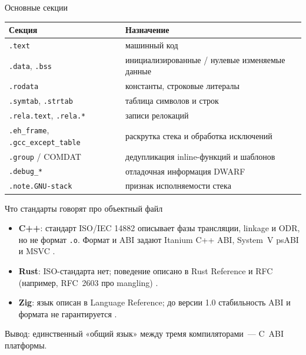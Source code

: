 \documentclass[aspectratio=169,11pt]{beamer}
\begin{document}
\begin{frame}{Основные секции}
  \small
  \begin{center}
    \begin{tabularx}{0.90\textwidth}{lY}
      \toprule
      Секция \cite{tis}                                   & Назначение                                                  \\
      \midrule
      \texttt{.text}                                      & машинный код                                                \\
      \texttt{.data}, \texttt{.bss}                       & инициализированные / нулевые изменяемые данные              \\
      \texttt{.rodata}                                    & константы, строковые литералы                               \\
      \texttt{.symtab}, \texttt{.strtab}                  & таблица символов и строк                                    \\
      \texttt{.rela.text}, \texttt{.rela.*}               & записи релокаций                                            \\
      \texttt{.eh\_frame}, \texttt{.gcc\_except\_table}   & раскрутка стека и обработка исключений \cite{itanium}       \\
      \texttt{.group} / COMDAT                            & дедупликация inline-функций и шаблонов \cite{itanium}       \\
      \texttt{.debug\_*}                                  & отладочная информация DWARF \cite{dwarf}                    \\
      \texttt{.note.GNU-stack}                            & признак исполняемости стека \cite{maskray}                  \\
      \bottomrule
    \end{tabularx}
  \end{center}
\end{frame}

\begin{frame}{Что стандарты говорят про объектный файл}
  \begin{itemize}
    \item \textbf{C++}: стандарт ISO/IEC 14882 описывает фазы трансляции, linkage и ODR, но не формат \texttt{.o}. Формат и ABI задают Itanium C++ ABI, System~V psABI и MSVC \cite{iso,itanium,psabi}.
    \item \textbf{Rust}: ISO-стандарта нет; поведение описано в Rust Reference и RFC (например, RFC~2603 про mangling) \cite{rustref,rfc2603}.
    \item \textbf{Zig}: язык описан в Language Reference; до версии 1.0 стабильность ABI и формата не гарантируется \cite{zigdoc}.
  \end{itemize}
  \bigskip
  \alert{Вывод:} единственный «общий язык» между тремя компиляторами~--- C~ABI платформы.
\end{frame}
\end{document}
